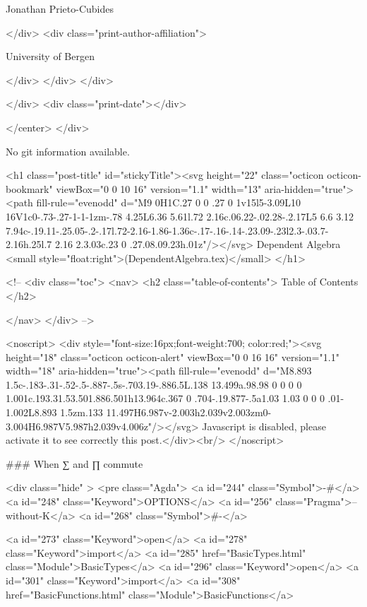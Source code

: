                   Jonathan Prieto-Cubides
                
              </div>
              <div class="print-author-affiliation">
                
                  University of Bergen
                
                </div>
            </div>
          </div>
          
          
        </div>
        <div class="print-date"></div>
        
        
    </center>
  </div>

  
  No git information available.
  

  <h1 class="post-title" id="stickyTitle"><svg height="22" class="octicon octicon-bookmark" viewBox="0 0 10 16" version="1.1" width="13" aria-hidden="true"><path fill-rule="evenodd" d="M9 0H1C.27 0 0 .27 0 1v15l5-3.09L10 16V1c0-.73-.27-1-1-1zm-.78 4.25L6.36 5.61l.72 2.16c.06.22-.02.28-.2.17L5 6.6 3.12 7.94c-.19.11-.25.05-.2-.17l.72-2.16-1.86-1.36c-.17-.16-.14-.23.09-.23l2.3-.03.7-2.16h.25l.7 2.16 2.3.03c.23 0 .27.08.09.23h.01z"/></svg> Dependent Algebra <small style="float:right">(DependentAlgebra.tex)</small>
  </h1>

  <!-- 
  <div class="toc">
    <nav>
    <h2 class="table-of-contents"> Table of Contents </h2>
      

    </nav>
  </div>
   -->

  <noscript>
  <div style="font-size:16px;font-weight:700; color:red;"><svg height="18" class="octicon octicon-alert" viewBox="0 0 16 16" version="1.1" width="18" aria-hidden="true"><path fill-rule="evenodd" d="M8.893 1.5c-.183-.31-.52-.5-.887-.5s-.703.19-.886.5L.138 13.499a.98.98 0 0 0 0 1.001c.193.31.53.501.886.501h13.964c.367 0 .704-.19.877-.5a1.03 1.03 0 0 0 .01-1.002L8.893 1.5zm.133 11.497H6.987v-2.003h2.039v2.003zm0-3.004H6.987V5.987h2.039v4.006z"/></svg> Javascript is disabled, please activate it to see correctly this post.</div><br/>
  </noscript>

  ### When ∑ and ∏ commute


<div class="hide" >
<pre class="Agda">
<a id="244" class="Symbol">{-#</a> <a id="248" class="Keyword">OPTIONS</a> <a id="256" class="Pragma">--without-K</a> <a id="268" class="Symbol">#-}</a>

<a id="273" class="Keyword">open</a> <a id="278" class="Keyword">import</a> <a id="285" href="BasicTypes.html" class="Module">BasicTypes</a>
<a id="296" class="Keyword">open</a> <a id="301" class="Keyword">import</a> <a id="308" href="BasicFunctions.html" class="Module">BasicFunctions</a>

